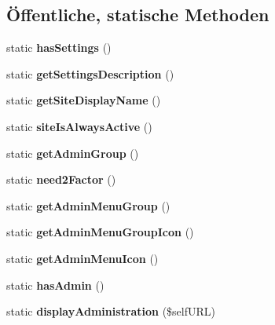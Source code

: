 \subsection*{Öffentliche, statische Methoden}
\begin{DoxyCompactItemize}
\item 
\mbox{\label{class_notenverwaltung_index_ab3b5da0ff41f67d5374e7a0d262e48d7}} 
static {\bfseries has\+Settings} ()
\item 
\mbox{\label{class_notenverwaltung_index_a6c59c512af59571e3fe4164525616369}} 
static {\bfseries get\+Settings\+Description} ()
\item 
\mbox{\label{class_notenverwaltung_index_a342c9922852e5096a4d8887eaddde3a9}} 
static {\bfseries get\+Site\+Display\+Name} ()
\item 
\mbox{\label{class_notenverwaltung_index_a1c6a4ba6fb04b4ea8bdea5738ac65803}} 
static {\bfseries site\+Is\+Always\+Active} ()
\item 
\mbox{\label{class_notenverwaltung_index_aebda9db1e32dc8ef5cc46cbe10a3f049}} 
static {\bfseries get\+Admin\+Group} ()
\item 
\mbox{\label{class_notenverwaltung_index_ac47fa84936f6912fa4e8b822a6ae3d87}} 
static {\bfseries need2\+Factor} ()
\item 
\mbox{\label{class_notenverwaltung_index_af420a589203d52f407c9a1fbc3c658e3}} 
static {\bfseries get\+Admin\+Menu\+Group} ()
\item 
\mbox{\label{class_notenverwaltung_index_a4ee47c209bbe17f1fa4df12255eb441c}} 
static {\bfseries get\+Admin\+Menu\+Group\+Icon} ()
\item 
\mbox{\label{class_notenverwaltung_index_a656444861deec062b8c0447352cf61fb}} 
static {\bfseries get\+Admin\+Menu\+Icon} ()
\item 
\mbox{\label{class_notenverwaltung_index_abd08d514745165c75c8f2c227b58368e}} 
static {\bfseries has\+Admin} ()
\item 
\mbox{\label{class_notenverwaltung_index_a1009d4cde0655a1cbbda0d51a3c34bba}} 
static {\bfseries display\+Administration} (\$self\+U\+RL)
\end{DoxyCompactItemize}
